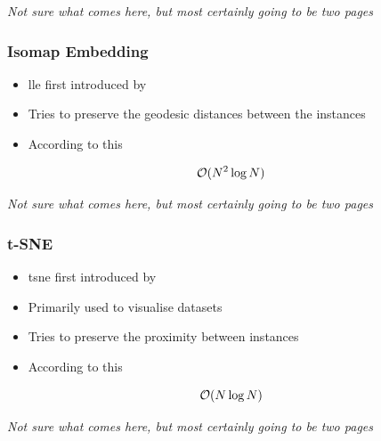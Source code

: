 \clearpage

\begin{center}
	\textit{Not sure what comes here, but most certainly going to be two pages}
\end{center}

\clearpage




\subsubsection{Isomap Embedding}

\begin{itemize}
	\item \Gls{lle} first introduced by \cite{tenenbaum2000global}
	\item Tries to preserve the geodesic distances between the instances \cite{HandsOnMLCh8}
	\item According to this \cite{DRUnsupervisedNearestNeighbors}
\end{itemize}

$$\mathcal{O}(N^2 \log N)$$

\clearpage

\begin{center}
	\textit{Not sure what comes here, but most certainly going to be two pages}
\end{center}

\clearpage



\subsubsection{t-SNE}

\begin{itemize}
	\item \gls{tsne} first introduced by \cite{van2008visualizing}
	\item Primarily used to visualise datasets
	\item Tries to preserve the proximity between instances \cite{HandsOnMLCh8}
	\item According to this \cite{van2014accelerating}
\end{itemize}

$$\mathcal{O}(N \log N)$$

\clearpage

\begin{center}
	\textit{Not sure what comes here, but most certainly going to be two pages}
\end{center}

\clearpage

